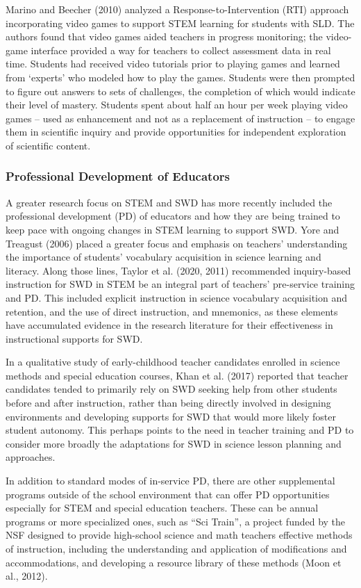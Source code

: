 \documentclass[11.5pt]{sig-alternate}
\begin{document}
\begin{large}
Marino and Beecher (2010) analyzed a Response-to-Intervention (RTI) approach incorporating video games to support STEM learning for students with SLD. The authors found that video games aided teachers in progress monitoring; the video-game interface provided a way for teachers to collect assessment data in real time. Students had received video tutorials prior to playing games and learned from ‘experts’ who modeled how to play the games. Students were then prompted to figure out answers to sets of challenges, the completion of which would indicate their level of mastery. Students spent about half an hour per week playing video games – used as enhancement and not as a replacement of instruction – to engage them in scientific inquiry and provide opportunities for independent exploration of scientific content.  

\subsubsection*{Professional Development of Educators}
A greater research focus on STEM and SWD has more recently included the professional development (PD) of educators and how they are being trained to keep pace with ongoing changes in STEM learning to support SWD. Yore and Treagust (2006) placed a greater focus and emphasis on teachers’ understanding the importance of students’ vocabulary acquisition in science learning and literacy. Along those lines, Taylor et al. (2020, 2011) recommended inquiry-based instruction for SWD in STEM be an integral part of teachers’ pre-service training and PD. This included explicit instruction in science vocabulary acquisition and retention, and the use of direct instruction, and mnemonics, as these elements have accumulated evidence in the research literature for their effectiveness in instructional supports for SWD.   

In a qualitative study of early-childhood teacher candidates enrolled in science methods and special education courses, Khan et al. (2017) reported that teacher candidates tended to primarily rely on SWD seeking help from other students before and after instruction, rather than being directly involved in designing environments and developing supports for SWD that would more likely foster student autonomy. This perhaps points to the need in teacher training and PD to consider more broadly the adaptations for SWD in science lesson planning and approaches.         

In addition to standard modes of in-service PD, there are other supplemental programs outside of the school environment that can offer PD opportunities especially for STEM and special education teachers. These can be annual programs or more specialized ones, such as “Sci Train”, a project funded by the NSF designed to provide high-school science and math teachers effective methods of instruction, including the understanding and application of modifications and accommodations, and developing a resource library of these methods (Moon et al., 2012).  


\end{large}
\end{document}
